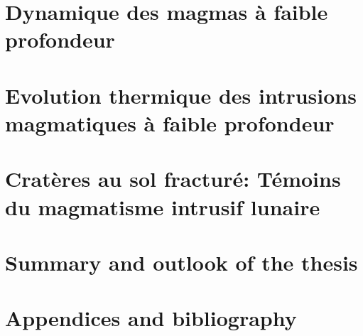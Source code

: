 \documentclass[a4paper,12pt,twoside]{ThesisStyle}
\begin{document}


\dominitoc
\setcounter{tocdepth}{2}

\cleardoublepage



\cleardoublepage





\tableofcontents

\mainmatter
\part{Dynamique des magmas à faible profondeur}

\pagestyle{fancy}

% 
% 

\part{Evolution   thermique  des   intrusions  magmatiques   à  faible
  profondeur}

% 
% 

\part{Cratères au sol fracturé: Témoins du magmatisme intrusif lunaire}

% 
%       

\part{Summary and outlook of the thesis}





\part{Appendices and bibliography}

\appendix
% 
% 
% 
% 
% 


\printnomenclature



\end{document}

